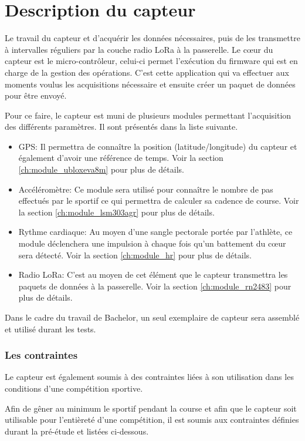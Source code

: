 \chapter{Description du capteur}\label{ch:capteur}

Le travail du capteur et d'acquérir les données nécessaires, puis de les transmettre à intervalles réguliers par la couche radio LoRa à la passerelle. Le cœur du capteur est le micro-contrôleur, celui-ci permet l'exécution du firmware qui est en charge de la gestion des opérations. C'est cette application qui va effectuer aux moments voulus les acquisitions nécessaire et ensuite créer un paquet de données pour être envoyé.

Pour ce faire, le capteur est muni de plusieurs modules permettant l'acquisition des différents paramètres. Il sont présentés dans la liste suivante.

\begin{itemize}
\item GPS: Il permettra de connaître la position (latitude/longitude) du capteur et également d'avoir une référence de temps. Voir la section \ref{ch:module_ubloxeva8m} pour plus de détails.
\item Accéléromètre: Ce module sera utilisé pour connaître le nombre de pas effectués par le sportif ce qui permettra de calculer sa cadence de course. Voir la section \ref{ch:module_lsm303agr} pour plus de détails.
\item Rythme cardiaque:  Au moyen d'une sangle pectorale portée par l'athlète, ce module déclenchera une impulsion à chaque fois qu'un battement du cœur sera détecté. Voir la section \ref{ch:module_hr} pour plus de détails.
\item Radio LoRa: C'est au moyen de cet élément que le capteur transmettra les paquets de données à la passerelle. Voir la section \ref{ch:module_rn2483} pour plus de détails.
\end{itemize}

Dans le cadre du travail de Bachelor, un seul exemplaire de capteur sera assemblé et utilisé durant les tests.

\subsection{Les contraintes}

Le capteur est également soumis à des contraintes liées à son utilisation dans les conditions d'une compétition sportive.

Afin de gêner au minimum le sportif pendant la course et afin que le capteur soit utilisable pour l'entièreté d'une compétition, il est soumis aux contraintes définies durant la pré-étude et listées ci-dessous.

